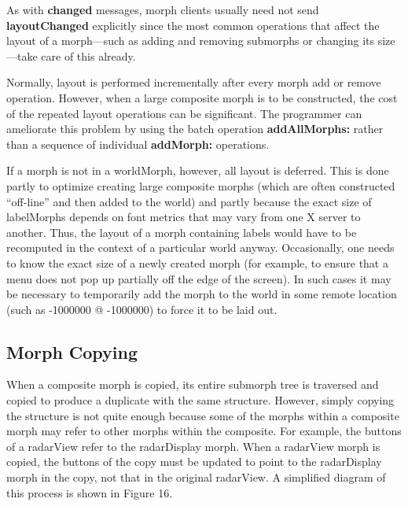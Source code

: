 \documentclass[letterpaper,10pt,english]{sphinxmanual}
\begin{document}
As with \textbf{changed} messages, morph clients usually need not send \textbf{layoutChanged} explicitly since the most common operations that affect the layout of a morph—such as adding and removing submorphs or changing its size—take care of this already.

Normally, layout is performed incrementally after every morph add or remove operation. However, when a large composite morph is to be constructed, the cost of the repeated layout operations can be significant. The programmer can ameliorate this problem by using the batch operation \textbf{addAllMorphs:} rather than a sequence of individual \textbf{addMorph:} operations.

If a morph is not in a worldMorph, however, all layout is deferred. This is done partly to optimize creating large composite morphs (which are often constructed ``off-line'' and then added to the world) and partly because the exact size of labelMorphs depends on font metrics that may vary from one X server to another. Thus, the layout of a morph containing labels would have to be recomputed in the context of a particular world anyway. Occasionally, one needs to know the exact size of a newly created morph (for example, to ensure that a menu does not pop up partially off the edge of the screen). In such cases it may be necessary to temporarily add the morph to the world in some remote location (such as -1000000 @ -1000000) to force it to be laid out.


\subsection{Morph Copying}
\label{morphic:morph-copying}
When a composite morph is copied, its entire submorph tree is traversed and copied to produce a duplicate with the same structure. However, simply copying the structure is not quite enough because some of the morphs within a composite morph may refer to other morphs within the composite. For example, the buttons of a radarView refer to the radarDisplay morph. When a radarView morph is copied, the buttons of the copy must be updated to point to the radarDisplay morph in the copy, not that in the original radarView. A simplified diagram of this process is shown in Figure 16.
\end{document}
